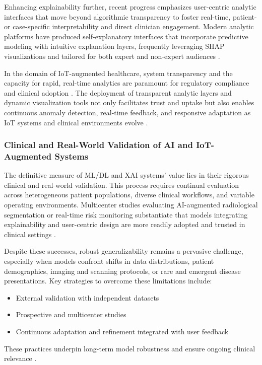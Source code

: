 \documentclass[sigconf]{acmart}
\begin{document}
Enhancing explainability further, recent progress emphasizes user-centric analytic interfaces that move beyond algorithmic transparency to foster real-time, patient- or case-specific interpretability and direct clinician engagement. Modern analytic platforms have produced self-explanatory interfaces that incorporate predictive modeling with intuitive explanation layers, frequently leveraging SHAP visualizations and tailored for both expert and non-expert audiences \cite{ref87,ref89,ref99,ref106}.

In the domain of IoT-augmented healthcare, system transparency and the capacity for rapid, real-time analytics are paramount for regulatory compliance and clinical adoption \cite{ref90,ref106}. The deployment of transparent analytic layers and dynamic visualization tools not only facilitates trust and uptake but also enables continuous anomaly detection, real-time feedback, and responsive adaptation as IoT systems and clinical environments evolve \cite{ref87,ref99}.

\subsubsection{Clinical and Real-World Validation of AI and IoT-Augmented Systems}

The definitive measure of ML/DL and XAI systems’ value lies in their rigorous clinical and real-world validation. This process requires continual evaluation across heterogeneous patient populations, diverse clinical workflows, and variable operating environments. Multicenter studies evaluating AI-augmented radiological segmentation or real-time risk monitoring substantiate that models integrating explainability and user-centric design are more readily adopted and trusted in clinical settings \cite{ref77,ref80,ref84,ref98,ref99,ref107}.

Despite these successes, robust generalizability remains a pervasive challenge, especially when models confront shifts in data distributions, patient demographics, imaging and scanning protocols, or rare and emergent disease presentations. Key strategies to overcome these limitations include:
\begin{itemize}
    \item External validation with independent datasets
    \item Prospective and multicenter studies
    \item Continuous adaptation and refinement integrated with user feedback
\end{itemize}
These practices underpin long-term model robustness and ensure ongoing clinical relevance \cite{ref77,ref99,ref107}.
\end{document}
